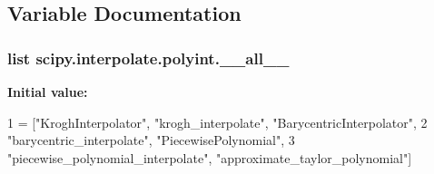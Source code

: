 \subsection{Variable Documentation}
\hypertarget{namespacescipy_1_1interpolate_1_1polyint_a2c5c933c7cc4ed4182fdfc30a752b009}{}
\subsubsection[{\+\_\+\+\_\+all\+\_\+\+\_\+}]{\setlength{\rightskip}{0pt plus 5cm}list scipy.\+interpolate.\+polyint.\+\_\+\+\_\+all\+\_\+\+\_\+}\label{namespacescipy_1_1interpolate_1_1polyint_a2c5c933c7cc4ed4182fdfc30a752b009}
{\bfseries Initial value\+:}
\begin{DoxyCode}
1 = [\textcolor{stringliteral}{"KroghInterpolator"}, \textcolor{stringliteral}{"krogh\_interpolate"}, \textcolor{stringliteral}{"BarycentricInterpolator"},
2            \textcolor{stringliteral}{"barycentric\_interpolate"}, \textcolor{stringliteral}{"PiecewisePolynomial"},
3            \textcolor{stringliteral}{"piecewise\_polynomial\_interpolate"}, \textcolor{stringliteral}{"approximate\_taylor\_polynomial"}]
\end{DoxyCode}
